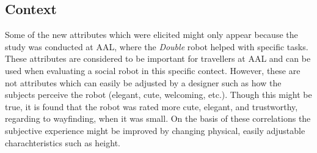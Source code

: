 \subsection{Context}
%
 Some of the new attributes which were elicited might only appear because the study was conducted at AAL, where the \textit{Double} robot helped with specific tasks. These attributes are considered to be important for travellers at AAL and can be used when evaluating a social robot in this specific contect. However, these are not attributes which can easily be adjusted by a designer such as how the subjects perceive the robot (elegant, cute, welcoming, etc.). Though this might be true, it is found that the robot was rated more cute, elegant, and trustworthy, regarding to wayfinding, when it was small. On the basis of these correlations the subjective experience might be improved by changing physical, easily adjustable charachteristics such as height.

 
